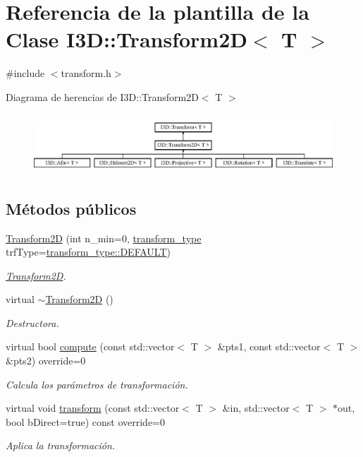 \hypertarget{class_i3_d_1_1_transform2_d}{}\section{Referencia de la plantilla de la Clase I3D\+:\+:Transform2D$<$ T $>$}
\label{class_i3_d_1_1_transform2_d}


{\ttfamily \#include $<$transform.\+h$>$}

Diagrama de herencias de I3D\+:\+:Transform2D$<$ T $>$\begin{figure}[H]
\begin{center}
\leavevmode
\includegraphics[height=2.255033cm]{class_i3_d_1_1_transform2_d}
\end{center}
\end{figure}
\subsection*{Métodos públicos}
\begin{DoxyCompactItemize}
\item 
\hyperlink{class_i3_d_1_1_transform2_d_a4ff815763fd74155e90ae79564661bb4}{Transform2D} (int n\+\_\+min=0, \hyperlink{group__trf_group_ga175e1580b1ecbc0710ad48060d56c2a3}{transform\+\_\+type} trf\+Type=\hyperlink{group__trf_group_gga175e1580b1ecbc0710ad48060d56c2a3a5b39c8b553c821e7cddc6da64b5bd2ee}{transform\+\_\+type\+::\+D\+E\+F\+A\+U\+LT})
\begin{DoxyCompactList}\small\item\em \hyperlink{class_i3_d_1_1_transform2_d}{Transform2D}. \end{DoxyCompactList}\item 
virtual \hyperlink{class_i3_d_1_1_transform2_d_afe769c95f4b238f62fd9b19ce10e6273}{$\sim$\+Transform2D} ()
\begin{DoxyCompactList}\small\item\em Destructora. \end{DoxyCompactList}\item 
virtual bool \hyperlink{class_i3_d_1_1_transform2_d_a61b1bb9c9a057ceec35c9320447070b9}{compute} (const std\+::vector$<$ T $>$ \&pts1, const std\+::vector$<$ T $>$ \&pts2) override=0
\begin{DoxyCompactList}\small\item\em Calcula los parámetros de transformación. \end{DoxyCompactList}\item 
virtual void \hyperlink{class_i3_d_1_1_transform2_d_a636c5afb2a198d46f7d9c3dc8c1800f1}{transform} (const std\+::vector$<$ T $>$ \&in, std\+::vector$<$ T $>$ $\ast$out, bool b\+Direct=true) const  override=0
\begin{DoxyCompactList}\small\item\em Aplica la transformación. \end{DoxyCompactList}\end{DoxyCompactItemize}
